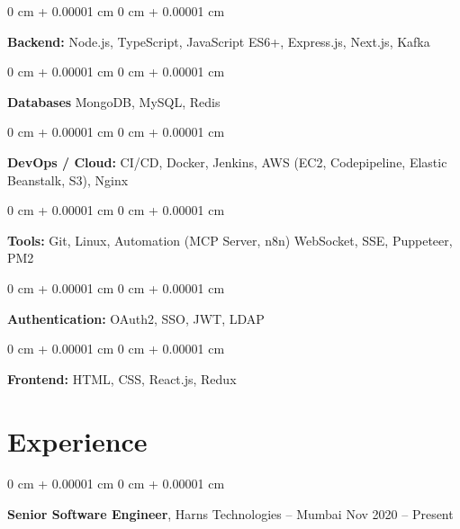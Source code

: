 \documentclass[10pt, letterpaper]{article}
\newenvironment{onecolentry}{
    \begin{adjustwidth}{
        0 cm + 0.00001 cm
    }{
        0 cm + 0.00001 cm
    }
}{
    \end{adjustwidth}
} %
\newenvironment{twocolentry}[2][]{
    \onecolentry
    \def\secondColumn{#2}
    \setcolumnwidth{\fill, 4.5 cm}
    \begin{paracol}{2}
}{
    \switchcolumn \raggedleft \secondColumn
    \end{paracol}
    \endonecolentry
} %
\begin{document}
        
        \begin{onecolentry}
            \textbf{Backend:} Node.js, TypeScript, JavaScript ES6+, Express.js, Next.js, Kafka 
        \end{onecolentry}

        \vspace{0.2 cm}


        \begin{onecolentry}
            \textbf{Databases} MongoDB, MySQL, Redis
        \end{onecolentry}
        \vspace{0.2 cm}

                \begin{onecolentry}
            \textbf{DevOps / Cloud:}  CI/CD, Docker, Jenkins, AWS (EC2, Codepipeline, Elastic Beanstalk, S3), Nginx
        \end{onecolentry}

\vspace{0.2 cm}
\begin{onecolentry}
            \textbf{Tools:} Git, Linux, Automation (MCP Server, n8n) WebSocket, SSE, Puppeteer, PM2
        \end{onecolentry}
        \vspace{0.2 cm}
                \begin{onecolentry}
            \textbf{Authentication:} OAuth2, SSO, JWT, LDAP
        \end{onecolentry}
\vspace{0.2 cm}
        \begin{onecolentry}
            \textbf{Frontend:} HTML, CSS, React.js, Redux
        \end{onecolentry}
\vspace{0.2 cm}

   
    \section{Experience}
   
        \begin{twocolentry}{
            Nov 2020 – Present
        }
            \textbf{Senior Software Engineer}, Harns Technologies -- Mumbai\end{twocolentry}
\end{document}
